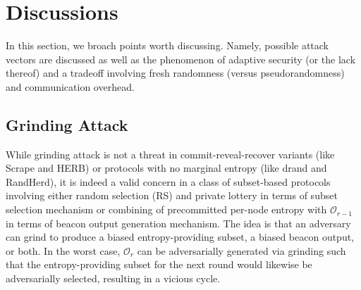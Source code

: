 \documentclass[letterpaper,twocolumn,10pt]{article}
\theoremstyle{definition}
\theoremstyle{remark}
\begin{document}
\section{Discussions}
In this section, we broach points worth discussing. Namely, possible attack vectors are discussed as well as the phenomenon of adaptive security (or the lack thereof) and a tradeoff involving fresh randomness (versus pseudorandomness) and communication overhead.

\subsection{Grinding Attack}
While grinding attack is not a threat in commit-reveal-recover variants (like Scrape and HERB) or protocols with no marginal entropy (like drand and RandHerd), it is indeed a valid concern in a class of subset-based protocols involving either random selection (RS) and private lottery in terms of subset selection mechanism or combining of precommitted per-node entropy with $\mathcal{O}_{r - 1}$ in terms of beacon output generation mechanism. The idea is that an adversary can grind to produce a biased entropy-providing subset, a biased beacon output, or both. In the worst case, $\mathcal{O}_r$ can be adversarially generated via grinding such that the entropy-providing subset for the next round would likewise be adversarially selected, resulting in a vicious cycle.
\end{document}
